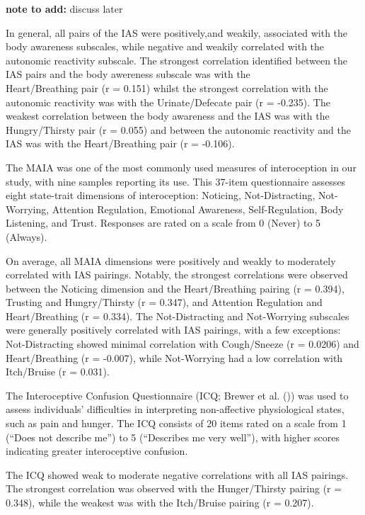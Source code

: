 \documentclass[
  man,
  floatsintext,
  longtable,
  nolmodern,
  notxfonts,
  notimes,
  colorlinks=true,linkcolor=blue,citecolor=blue,urlcolor=blue]{apa7}
\begin{document}
\textbf{note to add:} discuss later

In general, all pairs of the IAS were positively,and weakily, associated
with the body awareness subscales, while negative and weakily correlated
with the autonomic reactivity subscale. The strongest correlation
identified between the IAS pairs and the body awereness subscale was
with the\\
Heart/Breathing pair (r = 0.151) whilst the strongest correlation with
the autonomic reactivity was with the Urinate/Defecate pair (r =
-0.235). The weakest correlation between the body awareness and the IAS
was with the Hungry/Thirsty pair (r = 0.055) and between the autonomic
reactivity and the IAS was with the Heart/Breathing pair (r = -0.106).

The MAIA was one of the most commonly used measures of interoception in
our study, with nine samples reporting its use. This 37-item
questionnaire assesses eight state-trait dimensions of interoception:
Noticing, Not-Distracting, Not-Worrying, Attention Regulation, Emotional
Awareness, Self-Regulation, Body Listening, and Trust. Responses are
rated on a scale from 0 (Never) to 5 (Always).

On average, all MAIA dimensions were positively and weakly to moderately
correlated with IAS pairings. Notably, the strongest correlations were
observed between the Noticing dimension and the Heart/Breathing pairing
(r = 0.394), Trusting and Hungry/Thirsty (r = 0.347), and Attention
Regulation and Heart/Breathing (r = 0.334). The Not-Distracting and
Not-Worrying subscales were generally positively correlated with IAS
pairings, with a few exceptions: Not-Distracting showed minimal
correlation with Cough/Sneeze (r = 0.0206) and Heart/Breathing (r =
-0.007), while Not-Worrying had a low correlation with Itch/Bruise (r =
0.031).

The Interoceptive Confusion Questionnaire (ICQ; Brewer et al.
()) was used to assess
individuals' difficulties in interpreting non-affective physiological
states, such as pain and hunger. The ICQ consists of 20 items rated on a
scale from 1 (``Does not describe me'') to 5 (``Describes me very
well''), with higher scores indicating greater interoceptive confusion.

The ICQ showed weak to moderate negative correlations with all IAS
pairings. The strongest correlation was observed with the Hunger/Thirsty
pairing (r = 0.348), while the weakest was with the Itch/Bruise pairing
(r = 0.207).
\end{document}
